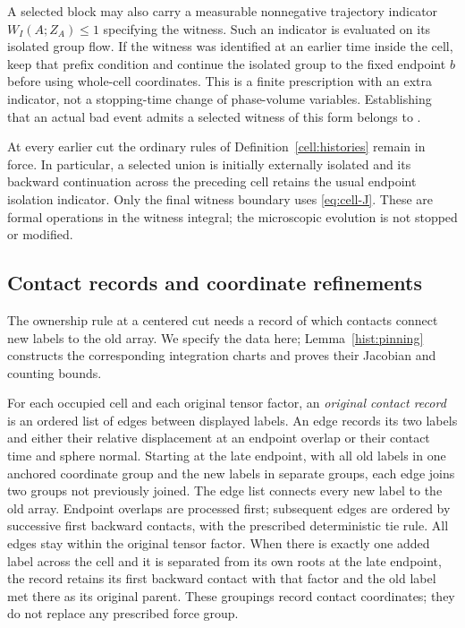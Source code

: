 \begin{definition}
A selected block may also carry a measurable nonnegative trajectory
indicator $W_I(A;Z_A)\leq1$ specifying the witness.  Such an indicator
is evaluated on its isolated group flow.  If the witness was
identified at an earlier time inside the cell, keep that prefix
condition and continue the isolated group to the fixed endpoint
$b$ before using whole-cell coordinates.  This is a finite
prescription with an extra indicator, not a stopping-time change
of phase-volume variables.  Establishing that an actual bad event
admits a selected witness of this form belongs to
.

At every earlier cut the ordinary rules of
Definition~\ref{cell:histories} remain in force.  In particular, a
selected union is initially externally isolated and its backward
continuation across the preceding cell retains the usual endpoint
isolation indicator.  Only the final witness boundary uses
\eqref{eq:cell-J}.  These are formal operations in the witness
integral; the microscopic evolution is not stopped or modified.
\end{definition}

\subsection{Contact records and coordinate refinements}
\label{cell:contact-records}

The ownership rule at a centered cut needs a record of which contacts
connect new labels to the old array.  We specify the data here;
Lemma~\ref{hist:pinning} constructs the corresponding integration
charts and proves their Jacobian and counting bounds.

For each occupied cell and each original tensor factor, an
\emph{original contact record} is an ordered list of edges between
displayed labels.  An edge records its two labels and either their
relative displacement at an endpoint overlap or their contact time
and sphere normal.  Starting at the late endpoint, with all old
labels in one anchored coordinate group and the new labels in
separate groups, each edge joins two groups not previously joined.
The edge list connects every new label to the old array.
Endpoint overlaps are processed first; subsequent edges are ordered
by successive first backward contacts, with the prescribed
deterministic tie rule.  All edges stay within the original tensor
factor.  When there is exactly one added label across the cell and
it is separated from its own roots at the late endpoint, the record
retains its first backward contact with that factor and the old label
met there as its original parent.  These groupings record contact coordinates;
they do not replace any prescribed force group.


